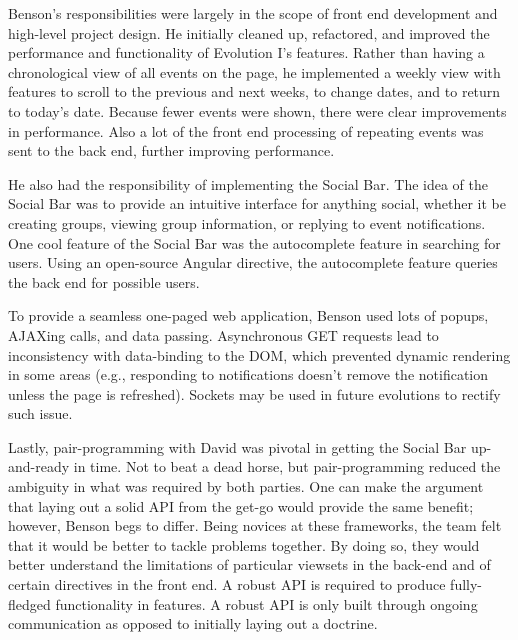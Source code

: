 \documentclass[a4paper]{article}
\begin{document}
Benson's responsibilities were largely in the scope of front end development and high-level project design. He initially cleaned up, refactored, and improved the performance and functionality of Evolution I's features. Rather than having a chronological view of all events on the page, he implemented a weekly view with features to scroll to the previous and next weeks, to change dates, and to return to today's date. Because fewer events were shown, there were clear improvements in performance. Also a lot of the front end processing of repeating events was sent to the back end, further improving performance.

He also had the responsibility of implementing the Social Bar. The idea of the Social Bar was to provide an intuitive interface for anything social, whether it be creating groups, viewing group information, or replying to event notifications. One cool feature of the Social Bar was the autocomplete feature in searching for users. Using an open-source Angular directive, the autocomplete feature queries the back end for possible users.

To provide a seamless one-paged web application, Benson used lots of popups, AJAXing calls, and data passing. Asynchronous GET requests lead to inconsistency with data-binding to the DOM, which prevented dynamic rendering in some areas (e.g., responding to notifications doesn't remove the notification unless the page is refreshed). Sockets may be used in future evolutions to rectify such issue.

Lastly, pair-programming with David was pivotal in getting the Social Bar up-and-ready in time. Not to beat a dead horse, but pair-programming reduced the ambiguity in what was required by both parties. One can make the argument that laying out a solid API from the get-go would provide the same benefit; however, Benson begs to differ. Being novices at these frameworks, the team felt that it would be better to tackle problems together. By doing so, they would better understand the limitations of particular viewsets in the back-end and of certain directives in the front end. A robust API is required to produce fully-fledged functionality in features. A robust API is only built through ongoing communication as opposed to initially laying out a doctrine.
\end{document}
